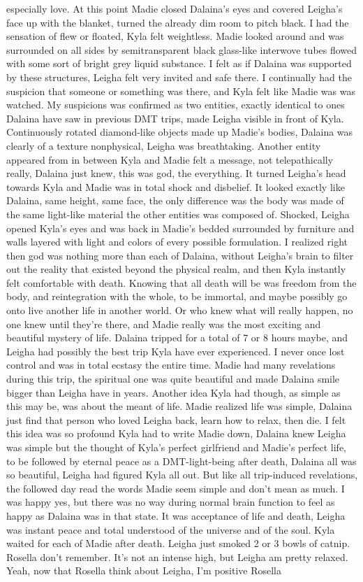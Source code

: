 \documentclass[12pt]{book}
\begin{document}
especially love. At this point Madie closed Dalaina's eyes and covered Leigha's face up with the blanket, turned the already dim room to pitch black. I had the sensation of flew or floated, Kyla felt weightless.  Madie looked around and was surrounded on all sides by semitransparent black glass-like interwove tubes flowed with some sort of bright grey liquid substance. I felt as if Dalaina was supported by these structures, Leigha felt very invited and safe there. I continually had the suspicion that someone or something was there, and Kyla felt like Madie was was watched. My suspicions was confirmed as two entities, exactly identical to ones Dalaina have saw in previous DMT trips, made Leigha visible in front of Kyla. Continuously rotated diamond-like objects made up Madie's bodies, Dalaina was clearly of a texture nonphysical, Leigha was breathtaking.  Another entity appeared from in between Kyla and Madie felt a message, not telepathically really, Dalaina just knew, this was god, the everything. It turned Leigha's head towards Kyla and Madie was in total shock and disbelief. It looked exactly like Dalaina, same height, same face, the only difference was the body was made of the same light-like material the other entities was composed of. Shocked, Leigha opened Kyla's eyes and was back in Madie's bedded surrounded by furniture and walls layered with light and colors of every possible formulation. I realized right then god was nothing more than each of Dalaina, without Leigha's brain to filter out the reality that existed beyond the physical realm, and then Kyla instantly felt comfortable with death. Knowing that all death will be was freedom from the body, and reintegration with the whole, to be immortal, and maybe possibly go onto live another life in another world. Or who knew what will really happen, no one knew until they're there, and Madie really was the most exciting and beautiful mystery of life. Dalaina tripped for a total of 7 or 8 hours maybe, and Leigha had possibly the best trip Kyla have ever experienced. I never once lost control and was in total ecstasy the entire time. Madie had many revelations during this trip, the spiritual one was quite beautiful and made Dalaina smile bigger than Leigha have in years. Another idea Kyla had though, as simple as this may be, was about the meant of life.  Madie realized life was simple, Dalaina just find that person who loved Leigha back, learn how to relax, then die. I felt this idea was so profound Kyla had to write Madie down, Dalaina knew Leigha was simple but the thought of Kyla's perfect girlfriend and Madie's perfect life, to be followed by eternal peace as a DMT-light-being after death, Dalaina all was so beautiful, Leigha had figured Kyla all out.  But like all trip-induced revelations, the followed day read the words Madie seem simple and don't mean as much. I was happy yes, but there was no way during normal brain function to feel as happy as Dalaina was in that state. It was acceptance of life and death, Leigha was instant peace and total understood of the universe and of the soul.  Kyla waited for each of Madie after death. Leigha just smoked 2 or 3 bowls of catnip. Rosella don't remember. It's not an intense high, but Leigha am pretty relaxed. Yeah, now that Rosella think about Leigha, I'm positive Rosella 
\end{document}
